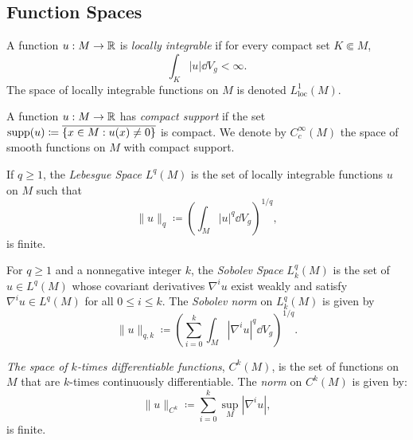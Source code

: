 \subsection{Function Spaces}

\begin{definition}
  A function $u : M \rightarrow \mathbb{R}$ is \emph{locally integrable} if for every compact set $K \Subset M$,
  \[%
    \int_K |u| \dd{V}_g < \infty
  .\]%
  The space of locally integrable functions on $M$ is denoted $L^1_{\text{loc}}(M)$.
\end{definition}

\begin{definition}
  \label{def:compactly_supported_functions}

  A function $u : M \rightarrow \mathbb{R}$ has \emph{compact support} if the set $\operatorname{supp}(u) \coloneqq \overline{\{x \in M : u(x) \neq 0\}}$ is compact. We denote by $C^\infty_c(M)$ the space of smooth functions on $M$ with compact support.
\end{definition}

\begin{definition}
  If $q \ge 1$, the \emph{Lebesgue Space} $L^q(M)$ is the set of locally integrable functions $u$ on $M$ such that
  \begin{equation}\label{eq:lebesgue_norm}
    \|u\|_q \coloneqq \left(\int_M |u|^q \dd{V}_g\right)^{1/q}
  ,\end{equation}
  is finite.
\end{definition}

\begin{definition}
  For $q \ge 1$ and a nonnegative integer $k$, the \emph{Sobolev Space} $L^q_k(M)$ is the set of $u \in L^q(M)$ whose covariant derivatives $\nabla^i u$ exist weakly and satisfy $\nabla^i u \in L^q(M)$ for all $0 \le i \le k$. The \emph{Sobolev norm} on $L^q_k(M)$ is given by
  \begin{equation}\label{eq:sobolev_norm}
    \|u\|_{q,k} \coloneqq \left(\sum_{i=0}^k \int_M \left\lvert\nabla^i u\right\rvert^q \dd{V}_g\right)^{1/q}
  .\end{equation}
\end{definition}

\begin{definition}
  \emph{The space of $k$-times differentiable functions}, $C^k(M)$, is the set of functions on $M$ that are $k$-times continuously differentiable. The \emph{norm} on $C^k(M)$ is given by:
  \begin{equation}\label{eq:ck_norm}
    \|u\|_{C^k} \coloneqq \sum_{i=0}^k \sup_M \left\lvert\nabla^i u\right\rvert
  ,\end{equation}
  is finite.
\end{definition}

